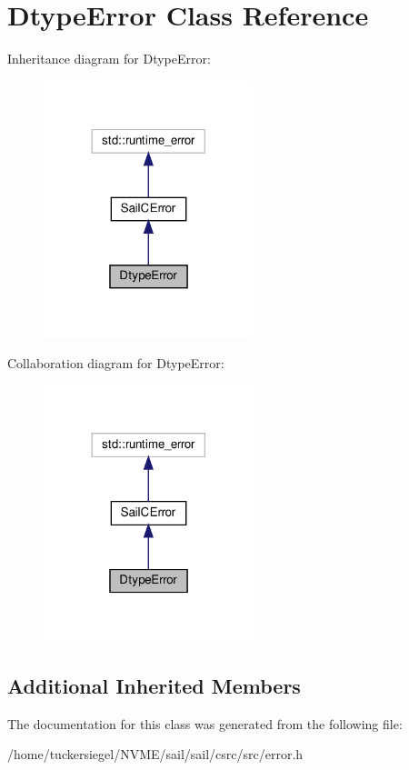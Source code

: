 \hypertarget{classDtypeError}{}\section{Dtype\+Error Class Reference}
\label{classDtypeError}


Inheritance diagram for Dtype\+Error\+:\nopagebreak
\begin{figure}[H]
\begin{center}
\leavevmode
\includegraphics[width=173pt]{classDtypeError__inherit__graph}
\end{center}
\end{figure}


Collaboration diagram for Dtype\+Error\+:\nopagebreak
\begin{figure}[H]
\begin{center}
\leavevmode
\includegraphics[width=173pt]{classDtypeError__coll__graph}
\end{center}
\end{figure}
\subsection*{Additional Inherited Members}


The documentation for this class was generated from the following file\+:\begin{DoxyCompactItemize}
\item 
/home/tuckersiegel/\+N\+V\+M\+E/sail/sail/csrc/src/error.\+h\end{DoxyCompactItemize}
